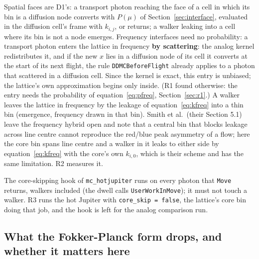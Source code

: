 \documentclass[11pt]{article}
\newcommand{\key}[1]{\texttt{#1}}
\begin{document}
Spatial faces are D1's: a transport photon reaching the face of a cell in which its
bin is a diffusion node converts with $P(\mu)$ of Section~\ref{sec:interface},
evaluated in the diffusion cell's frame with $k_{i,j}$, or returns; a walker leaking
into a cell where its bin is not a node emerges.  Frequency interfaces need no
probability: a transport photon enters the lattice in frequency \textbf{by
scattering}: the analog kernel redistributes it, and if the new $x$ lies in a
diffusion node of its cell it converts at the start of its next flight, the rule
\texttt{DDMCBeforeFlight} already applies to a photon that scattered in a diffusion
cell.  Since the kernel is exact, this entry is unbiased; the lattice's own
approximation begins only inside.  (R1 found otherwise: the entry needs the
probability of equation~\ref{eq:pfreq}, Section~\ref{sec:r1}.)  A walker leaves the lattice in frequency by the
leakage of equation~\ref{eq:kfreq} into a thin bin (emergence, frequency drawn in
that bin).  Smith et al.\ (their Section 5.1) leave the frequency hybrid open and
note that a central bin that blocks leakage across line centre cannot reproduce the
red/blue peak asymmetry of a flow; here the core bin spans line centre and a walker in
it leaks to either side by equation~\ref{eq:kfreq} with the core's own $k_{i,0}$,
which is their scheme and has the same limitation.  R2 measures it.

The core-skipping hook of \texttt{mc\_hotjupiter} runs on every photon that
\texttt{Move} returns, walkers included (the dwell calls \texttt{UserWorkInMove}); it
must not touch a walker.  R3 runs the hot Jupiter with \key{core\_skip = false}, the
lattice's core bin doing that job, and the hook is left for the analog comparison run.

\subsection{What the Fokker-Planck form drops, and whether it matters here}
\end{document}
